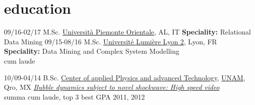 \documentclass[]{friggeri-cv}
\begin{document}
\section{education}

\begin{entrylist}
	\entry
	{09/16-02/17}
	{M.Sc. \href{http://www.em-dmkm.eu/}
		{}}
	{\href{http://www.uniupo.it/}{Università Piemonte Orientale}, AL, IT}
	{\textbf{Speciality:} Relational Data Mining
	}
	\entry
	{09/15-08/16}
	{M.Sc. \href{http://www.em-dmkm.eu/}
		{}}
	{\href{http://www.univ-lyon2.fr/}{Université Lumière Lyon 2}, Lyon, FR}
	{\textbf{Speciality:} Data Mining and Complex System Modelling \\ cum laude}
	
	\entry
	{10/09-04/14}
	{B.Sc. \href{http://www.fata.unam.mx/tecnologia}
		{}}
	{\href{http://www.fata.unam.mx/}{Center of applied Physics and advanced Technology}, \href{http://www.unam.mx/}{UNAM}, Qro, MX}           
	{\href{https://dl.dropboxusercontent.com/u/2115508/Tesis.pdf}{\emph{Bubble dynamics subject to novel shockwave: High speed video}}\\
		summa cum laude, top 3 best GPA 2011, 2012%
	}
\end{entrylist}
\end{document}

